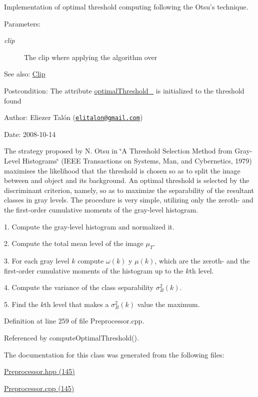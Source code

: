 Implementation of optimal threshold computing following the Otsu's technique. 

\begin{Desc}
\item[Parameters:]
\begin{description}
\item[{\em clip}]The clip where applying the algorithm over\end{description}
\end{Desc}
\begin{Desc}
\item[See also:]\hyperlink{class_clip}{Clip}\end{Desc}
\begin{Desc}
\item[Postcondition:]The attribute \hyperlink{class_preprocessor_865b1e28dd9535b96f70727a550104fe}{optimalThreshold\_\-} is initialized to the threshold found\end{Desc}
\begin{Desc}
\item[Author:]Eliezer Talón (\href{mailto:elitalon@gmail.com}{\tt elitalon@gmail.com}) \end{Desc}
\begin{Desc}
\item[Date:]2008-10-14\end{Desc}
The strategy proposed by N. Otsu in \char`\"{}A Threshold Selection Method from Gray-Level Histograms\char`\"{} (IEEE Transactions on Systems, Man, and Cybernetics, 1979) maximises the likelihood that the threshold is chosen so as to split the image between and object and its background. An optimal threshold is selected by the discriminant criterion, namely, so as to maximize the separability of the resultant classes in gray levels. The procedure is very simple, utilizing only the zeroth- and the first-order cumulative moments of the gray-level histogram. 

1. Compute the gray-level histogram and normalized it.

2. Compute the total mean level of the image $\mu_T$.

3. For each gray level $k$ compute $\omega(k)$ y $\mu(k)$, which are the zeroth- and the first-order cumulative moments of the histogram up to the $k$th level.

4. Compute the variance of the class separability $\sigma_B^2(k)$.

5. Find the $k$th level that makes a $\sigma_B^2(k)$ value the maximum. 

Definition at line 259 of file Preprocessor.cpp.

Referenced by computeOptimalThreshold().

The documentation for this class was generated from the following files:\begin{CompactItemize}
\item 
\hyperlink{_preprocessor_8hpp}{Preprocessor.hpp (145)}\item 
\hyperlink{_preprocessor_8cpp}{Preprocessor.cpp (145)}\end{CompactItemize}
